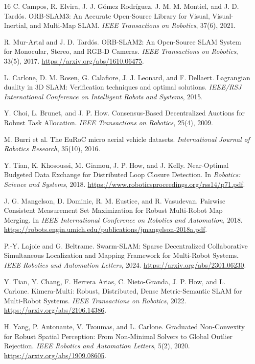 \documentclass[10pt,a4paper]{article}
\begin{document}
\begin{thebibliography}{16}
C. Campos, R. Elvira, J. J. G\'omez Rodr\'iguez, J. M. M. Montiel, and J. D. Tard\'os.
ORB-SLAM3: An Accurate Open-Source Library for Visual, Visual-Inertial, and Multi-Map SLAM.
\emph{IEEE Transactions on Robotics}, 37(6), 2021.

R. Mur-Artal and J. D. Tard\'os.
ORB-SLAM2: An Open-Source SLAM System for Monocular, Stereo, and RGB-D Cameras.
\emph{IEEE Transactions on Robotics}, 33(5), 2017. \url{https://arxiv.org/abs/1610.06475}.

L. Carlone, D. M. Rosen, G. Calafiore, J. J. Leonard, and F. Dellaert.
Lagrangian duality in 3D SLAM: Verification techniques and optimal solutions.
\emph{IEEE/RSJ International Conference on Intelligent Robots and Systems}, 2015.

Y. Choi, L. Brunet, and J. P. How.
Consensus-Based Decentralized Auctions for Robust Task Allocation.
\emph{IEEE Transactions on Robotics}, 25(4), 2009.

M. Burri et al. The EuRoC micro aerial vehicle datasets.
\emph{International Journal of Robotics Research}, 35(10), 2016.

Y. Tian, K. Khosoussi, M. Giamou, J. P. How, and J. Kelly. Near-Optimal Budgeted Data Exchange for Distributed Loop Closure Detection. In \emph{Robotics: Science and Systems}, 2018. \url{https://www.roboticsproceedings.org/rss14/p71.pdf}.

J. G. Mangelson, D. Dominic, R. M. Eustice, and R. Vasudevan. Pairwise Consistent Measurement Set Maximization for Robust Multi-Robot Map Merging. In \emph{IEEE International Conference on Robotics and Automation}, 2018. \url{https://robots.engin.umich.edu/publications/jmangelson-2018a.pdf}.

P.-Y. Lajoie and G. Beltrame. Swarm-SLAM: Sparse Decentralized Collaborative Simultaneous Localization and Mapping Framework for Multi-Robot Systems. \emph{IEEE Robotics and Automation Letters}, 2024. \url{https://arxiv.org/abs/2301.06230}.

Y. Tian, Y. Chang, F. Herrera Arias, C. Nieto-Granda, J. P. How, and L. Carlone. Kimera-Multi: Robust, Distributed, Dense Metric-Semantic SLAM for Multi-Robot Systems. \emph{IEEE Transactions on Robotics}, 2022. \url{https://arxiv.org/abs/2106.14386}.

H. Yang, P. Antonante, V. Tzoumas, and L. Carlone. Graduated Non-Convexity for Robust Spatial Perception: From Non-Minimal Solvers to Global Outlier Rejection. \emph{IEEE Robotics and Automation Letters}, 5(2), 2020. \url{https://arxiv.org/abs/1909.08605}.


\end{thebibliography}
\end{document}
